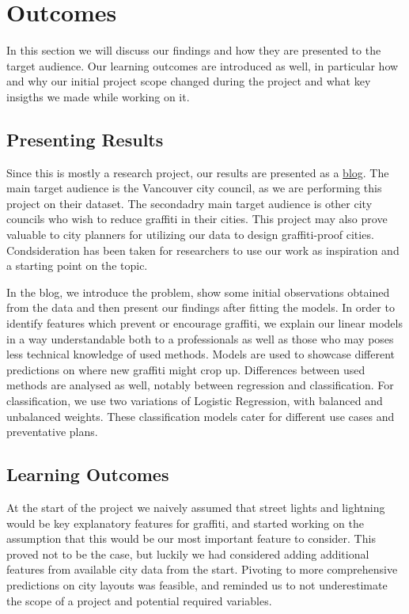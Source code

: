 \chapter{Outcomes}
In this section we will discuss our findings and how they are presented to the target audience. Our learning outcomes are introduced as well, in particular how and why our initial project scope changed during the project and what key insigths we made while working on it. 

\section{Presenting Results}

Since this is mostly a research project, our results are presented as a \href{https://cowkeyman.github.io/PredictingGraffitiUsingCityLayouts/}{blog}. The main target audience is the Vancouver city council, as we are performing this project on their dataset. The secondadry main target audience is other city councils who wish to reduce graffiti in their cities. This project may also prove valuable to city planners for utilizing our data to design graffiti-proof cities. Condsideration has been taken for researchers to use our work as inspiration and a starting point on the topic.

In the blog, we introduce the problem, show some initial observations obtained from the data and then present our findings after fitting the models. In order to identify features which prevent or encourage graffiti, we explain our linear models in a way understandable both to a professionals as well as those who may poses less technical knowledge of used methods. Models are used to showcase different predictions on where new graffiti might crop up. Differences between used methods are analysed as well, notably between regression and classification. For classification, we use two variations of Logistic Regression, with balanced and unbalanced weights. These classification models cater for different use cases and preventative plans.  

\section{Learning Outcomes} %
At the start of the project we naively assumed that street lights and lightning would be key explanatory features for graffiti, and started working on the assumption that this would be our most important feature to consider. This proved not to be the case, but luckily we had considered adding additional features from available city data from the start. Pivoting to more comprehensive predictions on city layouts was feasible, and reminded us to not underestimate the scope of a project and potential required variables.

